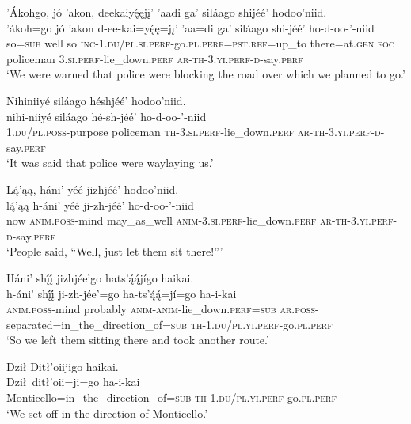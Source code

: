 \ea\label{ex:text7-9-6}
’Ákohgo, jó ’akon, deekaiyę́ęjį’ ’aadi ga’ siláago shijéé’ hodoo’niid.\\
\gll ’ákoh=go	jó	’akon	d-ee-kai=yę́ę=jį’	’aa=di	ga’	siláago	shi-jéé’	ho-d-oo-’-niid\\
     so=\textsc{sub}	well	so	\textsc{inc}-1.\textsc{du}/\textsc{pl}.\textsc{si}.\textsc{perf}-go.\textsc{pl}.\textsc{perf}=\textsc{pst}.\textsc{ref}=up\_to	there=at.\textsc{gen}	\textsc{foc}	policeman	3.\textsc{si}.\textsc{perf}-lie\_down.\textsc{perf}	\textsc{ar}-\textsc{th}-3.\textsc{yi}.\textsc{perf}-\textsc{d}-say.\textsc{perf}\\
\glt `We were warned that police were blocking the road over which we planned to go.'
\z

\ea\label{ex:text7-9-7}
Nihiniiyé siláago héshjéé’ hodoo’niid.\\
\gll nihi-niiyé	siláago	hé-sh-jéé’	ho-d-oo-’-niid\\
     1.\textsc{du}/\textsc{pl}.\textsc{poss}-purpose	policeman	\textsc{th}-3.\textsc{si}.\textsc{perf}-lie\_down.\textsc{perf}	\textsc{ar}-\textsc{th}-3.\textsc{yi}.\textsc{perf}-\textsc{d}-say.\textsc{perf}\\
\glt `It was said that police were waylaying us.'
\z

\ea\label{ex:text7-9-8}
Lą́’ąą, háni’ yéé jizhjéé’ hodoo’niid.\\
\gll lą́’ąą	h-áni’	yéé	ji-zh-jéé’	ho-d-oo-’-niid\\
     now	\textsc{anim}.\textsc{poss}-mind	may\_as\_well	\textsc{anim}-3.\textsc{si}.\textsc{perf}-lie\_down.\textsc{perf}	\textsc{ar}-\textsc{th}-3.\textsc{yi}.\textsc{perf}-\textsc{d}-say.\textsc{perf}\\
\glt `People said, ``Well, just let them sit there!'''
\z

\ea\label{ex:text7-9-9}
Háni’ shį́į́ jizhjée’go hats’ą́ą́jígo haikai.\\
\gll h-áni’	shį́į́	ji-zh-jée’=go	ha-ts’ą́ą́=jí=go	ha-i-kai\\
     \textsc{anim}.\textsc{poss}-mind	probably	\textsc{anim}-\textsc{anim}-lie\_down.\textsc{perf}=\textsc{sub}	\textsc{ar}.\textsc{poss}-separated=in\_the\_direction\_of=\textsc{sub}	\textsc{th}-1.\textsc{du}/\textsc{pl}.\textsc{yi}.\textsc{perf}-go.\textsc{pl}.\textsc{perf}\\
\glt `So we left them sitting there and took another route.'
\z

\ea\label{ex:text7-9-10}
Dził Ditł’oiijigo haikai.\\
\gll Dził~{ditł’oii=ji=go}	ha-i-kai\\
     Monticello=in\_the\_direction\_of=\textsc{sub}	\textsc{th}-1.\textsc{du}/\textsc{pl}.\textsc{yi}.\textsc{perf}-go.\textsc{pl}.\textsc{perf}\\
\glt `We set off in the direction of Monticello.'
\z


